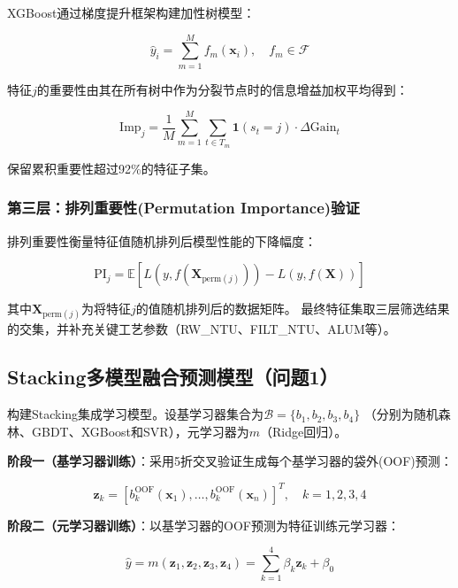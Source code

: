 \documentclass[12pt,a4paper]{ctexart}
\begin{document}
XGBoost通过梯度提升框架构建加性树模型\cite{ref2}：

\begin{equation}\label{eq:xgb}
\hat{y}_i = \sum_{m=1}^{M} f_m(\mathbf{x}_i), \quad f_m \in \mathcal{F}
\end{equation}

特征$j$的重要性由其在所有树中作为分裂节点时的信息增益加权平均得到：

\begin{equation}\label{eq:importance}
\mathrm{Imp}_j = \frac{1}{M}\sum_{m=1}^{M}\sum_{t \in T_m} \mathbf{1}(s_t=j) \cdot \Delta\mathrm{Gain}_t
\end{equation}

保留累积重要性超过92\%的特征子集。

\subsubsection{第三层：排列重要性(Permutation Importance)验证}

排列重要性衡量特征值随机排列后模型性能的下降幅度\cite{ref6}：

\begin{equation}\label{eq:perm}
\mathrm{PI}_j = \mathbb{E}[L(y, f(\mathbf{X}_{\mathrm{perm}(j)})) - L(y, f(\mathbf{X}))]
\end{equation}

其中$\mathbf{X}_{\mathrm{perm}(j)}$为将特征$j$的值随机排列后的数据矩阵。
最终特征集取三层筛选结果的交集，并补充关键工艺参数（RW\_NTU、FILT\_NTU、ALUM等）。

\subsection{Stacking多模型融合预测模型（问题1）}

构建Stacking集成学习模型\cite{ref5}。设基学习器集合为$\mathcal{B} = \{b_1, b_2, b_3, b_4\}$
（分别为随机森林、GBDT、XGBoost和SVR），元学习器为$m$（Ridge回归）。

\textbf{阶段一（基学习器训练）}：采用5折交叉验证生成每个基学习器的袋外(OOF)预测：

\begin{equation}\label{eq:stack1}
\mathbf{z}_k = [b_k^{\mathrm{OOF}}(\mathbf{x}_1), \ldots, b_k^{\mathrm{OOF}}(\mathbf{x}_n)]^T, \quad k=1,2,3,4
\end{equation}

\textbf{阶段二（元学习器训练）}：以基学习器的OOF预测为特征训练元学习器：

\begin{equation}\label{eq:stack2}
\hat{y} = m(\mathbf{z}_1, \mathbf{z}_2, \mathbf{z}_3, \mathbf{z}_4) = \sum_{k=1}^{4} \beta_k \mathbf{z}_k + \beta_0
\end{equation}
\end{document}
